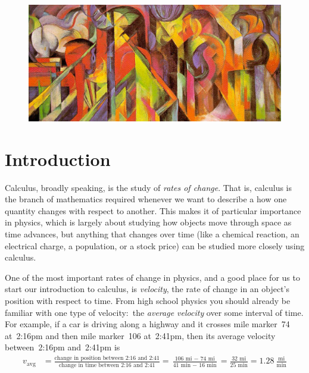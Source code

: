 




\noindent {}

\quad

\begin{figure}[h]
	\centering
	\includegraphics[height=0.4\textwidth]{figures/stables.jpg} %
\end{figure}

\section*{Introduction}

Calculus, broadly speaking, is the study of \textit{rates of change}. That is, calculus is the branch of mathematics required whenever we want to describe a how one quantity changes with respect to another. This makes it of particular importance in physics, which is largely about studying how objects move through space as time advances, but anything that changes over time (like a chemical reaction, an electrical charge, a population, or a stock price) can be studied more closely using calculus.

One of the most important rates of change in physics, and a good place for us to start our introduction to calculus, is \textit{velocity}, the rate of change in an object's position with respect to time. From high school physics you should already be familiar with one type of velocity:~the \textit{average velocity} over some interval of time. For example, if a car is driving along a highway and it crosses mile marker~74 at~2:16pm and then mile marker~106 at~2:41pm, then its average velocity between~2:16pm and~2:41pm is
\begin{align*}
	v_{\text{avg}} &= \frac{\text{change in position between 2:16 and 2:41}}{\text{change in time between 2:16 and 2:41}} = \frac{\text{106 mi $-$ 74 mi}}{\text{41 min $-$ 16 min}} = \frac{\text{32 mi}}{\text{25 min}} = 1.28~\frac{\text{mi}}{\text{min}}
\end{align*}

